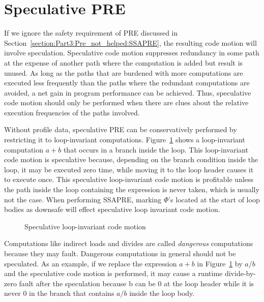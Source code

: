 \section{Speculative PRE}
If we ignore the safety requirement of PRE discussed in Section~\ref{section:Part3:Pre_not_helped:SSAPRE}, the resulting code motion will involve speculation. 
Speculative code motion suppresses redundancy in some path at the expense of another path where the computation is added but result is unused. 
As long as the paths that are burdened with more computations are executed less frequently than the paths where the redundant computations are avoided, a net gain in program performance can be achieved. 
Thus, speculative code motion should only be performed when there are clues about the relative execution frequencies of the paths involved.

Without profile data, speculative PRE can be conservatively performed by restricting it to loop-invariant computations. 
Figure~\ref{fig:spec-pre} shows a loop-invariant computation $a+b$ that occurs in a branch inside the loop. 
This loop-invariant code motion is speculative because, depending on the branch condition inside the loop, it may be executed zero time, while moving it to the loop header causes it to execute once. 
This speculative loop-invariant code motion is profitable unless the path inside the loop containing the expression is never taken, which is usually not the case. 
When performing SSAPRE, marking $\Phi$'s located at the start of loop bodies as downsafe will effect speculative loop invariant code motion.

\begin{figure}
\centering
\hspace{2cm}
\caption{Speculative loop-invariant code motion}
\label{fig:spec-pre}
\end{figure}

Computations like indirect loads and divides are called \emph{dangerous} computations because they may fault. 
Dangerous computations in general should not be speculated. 
As an example, if we replace the expression $a+b$ in Figure~\ref{fig:spec-pre} by $a/b$ and the speculative code motion is performed, it may cause a runtime divide-by-zero fault after the speculation because b can be $0$ at the loop header while it is never $0$ in the branch that contains $a/b$ inside the loop body.

